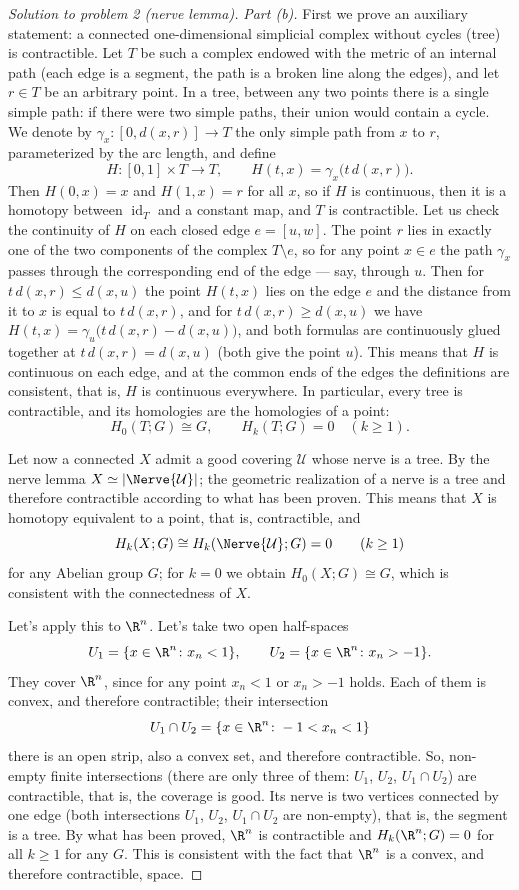 \documentclass[a4paper,12pt]{report}
\begin{document}
\begin{proof}[Solution to problem \textup{2} \textup{(}nerve lemma\textup{)}]
\textit{Part \textup{(b)}.} First we prove an auxiliary statement: a connected one-dimensional simplicial complex without cycles \textup{(}tree\textup{)} is contractible. Let $T$ be such a complex endowed with the metric of an internal path \textup{(}each edge is a segment, the path is a broken line along the edges\textup{)}, and let $r\in T$ be an arbitrary point. In a tree, between any two points there is a single simple path: if there were two simple paths, their union would contain a cycle. We denote by $\gamma_x\colon[0,d(x,r)]\to T$ the only simple path from $x$ to $r$, parameterized by the arc length, and define
\[
H\colon[0,1]\times T\to T,\qquad H(t,x)=\gamma_x\bigl(t\,d(x,r)\bigr).
\]
Then $H(0,x)=x$ and $H(1,x)=r$ for all $x$, so if $H$ is continuous, then it is a homotopy between $\operatorname{id}_T$ and a constant map, and $T$ is contractible. Let us check the continuity of $H$ on each closed edge $e=[u,w]$. The point $r$ lies in exactly one of the two components of the complex $T\setminus e$, so for any point $x\in e$ the path $\gamma_x$ passes through the corresponding end of the edge --- say, through $u$. Then for $t\,d(x,r)\le d(x,u)$ the point $H(t,x)$ lies on the edge $e$ and the distance from it to $x$ is equal to $t\,d(x,r)$, and for $t\,d(x,r)\ge d(x,u)$ we have $H(t,x)=\gamma_u\bigl(t\,d(x,r)-d(x,u)\bigr)$, and both formulas are continuously glued together at $t\,d(x,r)=d(x,u)$ \textup{(}both give the point $u$\textup{)}. This means that $H$ is continuous on each edge, and at the common ends of the edges the definitions are consistent, that is, $H$ is continuous everywhere. In particular, every tree is contractible, and its homologies are the homologies of a point:
\[
H_0(T;G)\cong G,\qquad H_k(T;G)=0\quad(k\ge1).
\]

Let now a connected $X$ admit a good covering $\mathcal U$ whose nerve is a tree. By the nerve lemma $X\simeq|\Nerve{\mathcal U}|$; the geometric realization of a nerve is a tree and therefore contractible according to what has been proven. This means that $X$ is homotopy equivalent to a point, that is, contractible, and
\[
H_k(X;G)\cong H_k(\Nerve{\mathcal U};G)=0\qquad(k\ge1)
\]
for any Abelian group $G$; for $k=0$ we obtain $H_0(X;G)\cong G$, which is consistent with the connectedness of $X$.

Let's apply this to $\R^n$. Let's take two open half-spaces
\[
U_1=\{x\in\R^n\colon x_n<1\},\qquad U_2=\{x\in\R^n\colon x_n>-1\}.
\]
They cover $\R^n$, since for any point $x_n<1$ or $x_n>-1$ holds. Each of them is convex, and therefore contractible; their intersection
\[
U_1\cap U_2=\{x\in\R^n\colon -1<x_n<1\}
\]
there is an open strip, also a convex set, and therefore contractible. So, non-empty finite intersections \textup{(}there are only three of them: $U_1$, $U_2$, $U_1\cap U_2$\textup{)} are contractible, that is, the coverage is good. Its nerve is two vertices connected by one edge \textup{(}both intersections $U_1$, $U_2$, $U_1\cap U_2$ are non-empty\textup{)}, that is, the segment is a tree. By what has been proved, $\R^n$ is contractible and $H_k(\R^n;G)=0$ for all $k\ge1$ for any $G$. This is consistent with the fact that $\R^n$ is a convex, and therefore contractible, space.


\end{proof}
\end{document}
